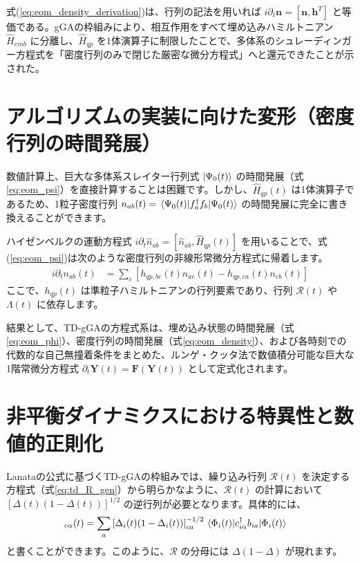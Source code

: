 \documentclass[a4paper,11pt]{ltjarticle}
\begin{document}
式(\ref{eq:eom_density_derivation})は、行列の記法を用いれば $i\partial_t \bm{n} = [\bm{n}, \bm{h}^T]$ と等価である。gGAの枠組みにより、相互作用をすべて埋め込みハミルトニアン $\hat{H}_{emb}$ に分離し、$\hat{H}_{qp}$ を1体演算子に制限したことで、多体系のシュレーディンガー方程式を「密度行列のみで閉じた厳密な微分方程式」へと還元できたことが示された。

\section{アルゴリズムの実装に向けた変形（密度行列の時間発展）}
数値計算上、巨大な多体系スレイター行列式 $\ket{\Psi_0(t)}$ の時間発展（式\ref{eq:eom_psi}）を直接計算することは困難です。しかし、$\hat{H}_{qp}(t)$ は1体演算子であるため、1粒子密度行列 $n_{ab}(t) = \mel{\Psi_0(t)}{f_a^\dagger f_b}{\Psi_0(t)}$ の時間発展に完全に書き換えることができます。

ハイゼンベルクの運動方程式 $i\partial_t \hat{n}_{ab} = [\hat{n}_{ab}, \hat{H}_{qp}(t)]$ を用いることで、式(\ref{eq:eom_psi})は次のような密度行列の非線形常微分方程式に帰着します。
\begin{align}
i\partial_t n_{ab}(t) &= \sum_c \left[ h_{qp, bc}(t) n_{ac}(t) - h_{qp, ca}(t) n_{cb}(t) \right]
\label{eq:eom_density}
\end{align}
ここで、$h_{qp}(t)$ は準粒子ハミルトニアンの行列要素であり、行列 $\mathcal{R}(t)$ や $\Lambda(t)$ に依存します。

結果として、TD-gGAの方程式系は、埋め込み状態の時間発展（式\ref{eq:eom_phi}）、密度行列の時間発展（式\ref{eq:eom_density}）、および各時刻での代数的な自己無撞着条件をまとめた、ルンゲ・クッタ法で数値積分可能な巨大な1階常微分方程式 $\partial_t \bm{Y}(t) = \bm{F}(\bm{Y}(t))$ として定式化されます。

\section{非平衡ダイナミクスにおける特異性と数値的正則化}
Lanataの公式に基づくTD-gGAの枠組みでは、繰り込み行列 $\mathcal{R}(t)$ を決定する方程式（式\ref{eq:td_R_gen}）から明らかなように、$\mathcal{R}(t)$ の計算において $\left[ \Delta(t)(1-\Delta(t)) \right]^{1/2}$ の逆行列が必要となります。具体的には、
\begin{align}
    [\mathcal{R}_i]_{c\alpha}(t) &= \sum_{a} \left[ \Delta_i(t)(1-\Delta_i(t)) \right]^{-1/2}_{ca} \mel{\Phi_i(t)}{c_{i\alpha}^\dagger b_{ia}}{\Phi_i(t)}
\end{align}
と書くことができます。このように、$\mathcal{R}$ の分母には $\Delta(1-\Delta)$ が現れます。
\end{document}
